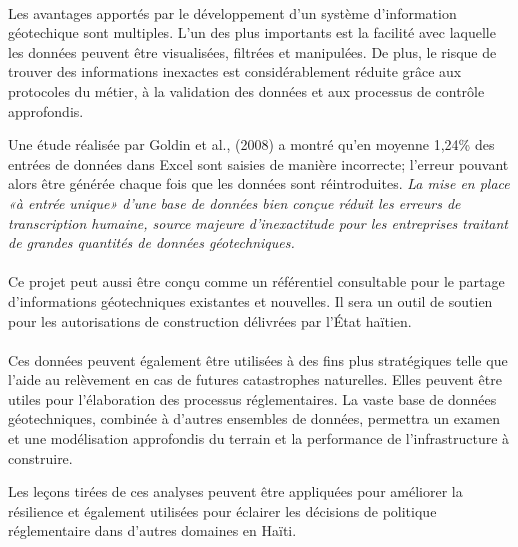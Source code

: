 \paragraph{}
Les avantages apportés par le développement d'un système d'information géotechique
sont multiples.
L'un des plus importants est la facilité avec laquelle les données 
peuvent être visualisées, filtrées et manipulées.
De plus, le risque de trouver  des informations inexactes est considérablement
réduite grâce aux protocoles du métier, à la validation des données et aux processus
de contrôle approfondis.

Une 
étude réalisée par Goldin et al.,
(2008) a montré qu'en moyenne 1,24\% des entrées de données dans Excel 
sont saisies de manière incorrecte; l'erreur pouvant alors
être générée chaque fois que les données sont réintroduites. \textit{ La mise en place 
«à entrée unique» d’une base de données bien conçue réduit les erreurs de 
transcription humaine, source majeure d’inexactitude pour les entreprises
traitant de grandes quantités de données géotechniques.}
\cite{keen2015development}
\paragraph{}
Ce projet peut aussi être
conçu comme un référentiel consultable pour le partage d'informations 
géotechniques existantes et nouvelles.
Il sera un outil de soutien pour les autorisations de construction délivrées par l'État haïtien.
\paragraph{}
\par
Ces données peuvent également être utilisées à des fins plus stratégiques telle que l'aide au 
relèvement en cas de futures catastrophes naturelles.
Elles peuvent être utiles pour l'élaboration des processus réglementaires.
La vaste base de données géotechniques,
combinée à d'autres ensembles de données, permettra un examen et une modélisation approfondis du terrain
et la performance de l'infrastructure à construire. 
\par
Les leçons tirées de ces analyses peuvent être appliquées pour
améliorer la résilience et également utilisées pour éclairer les 
décisions de politique réglementaire dans d'autres domaines en Haïti.

